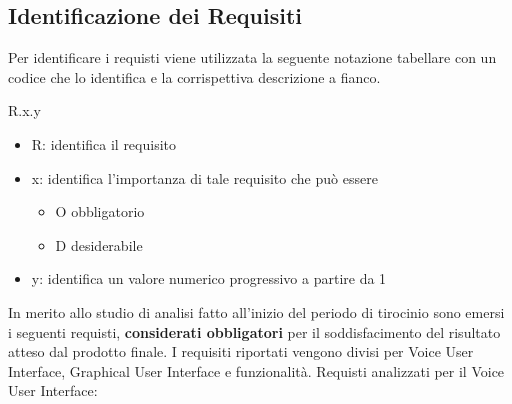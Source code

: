 \subsection{Identificazione dei Requisiti}
Per identificare i requisti viene utilizzata la seguente notazione tabellare con un codice che lo identifica e la corrispettiva descrizione a fianco.
\begin{center}
    R.x.y
\end{center}
\begin{itemize}
    \item R: identifica il requisito
    \item x: identifica l'importanza di tale requisito che può essere
        \begin{itemize}
            \item O obbligatorio
            \item D desiderabile
        \end{itemize}
    \item y: identifica un valore numerico progressivo a partire da 1
\end{itemize}
In merito allo studio di analisi fatto all'inizio del periodo di tirocinio sono emersi i seguenti requisti, \textbf{considerati obbligatori} per il soddisfacimento del risultato atteso dal prodotto finale. I requisiti riportati vengono divisi per Voice User Interface, Graphical User Interface e funzionalità.
\newpage
\noindent Requisti analizzati per il Voice User Interface:
